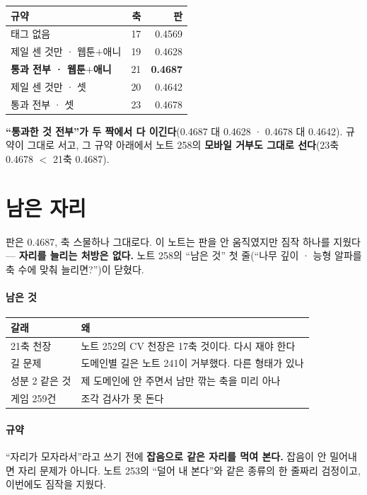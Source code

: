 \documentclass[10pt]{article}
\begin{document}
\begin{center}\small
\begin{tabular}{lrr}
\hline
규약 & 축 & 판 \\
\hline
태그 없음 & 17 & 0.4569 \\
제일 센 것만 · 웹툰$+$애니 & 19 & 0.4628 \\
\textbf{통과 전부 · 웹툰$+$애니} & 21 & \textbf{0.4687} \\
제일 센 것만 · 셋 & 20 & 0.4642 \\
통과 전부 · 셋 & 23 & 0.4678 \\
\hline
\end{tabular}
\end{center}

\textbf{``통과한 것 전부''가 두 짝에서 다 이긴다}(0.4687 대 0.4628 ·
0.4678 대 0.4642). 규약이 그대로 서고, 그 규약 아래에서 노트 258의
\textbf{모바일 거부도 그대로 선다}(23축 0.4678 $<$ 21축 0.4687).

\section{남은 자리}

판은 0.4687, 축 스물하나 그대로다. 이 노트는 판을 안 움직였지만 짐작 하나를
지웠다 --- \textbf{자리를 늘리는 처방은 없다.} 노트 258의 ``남은 것'' 첫
줄(``나무 깊이 · 능형 알파를 축 수에 맞춰 늘리면?'')이 닫혔다.

\paragraph{남은 것}
\begin{center}\small
\begin{tabular}{ll}
\hline
갈래 & 왜 \\
\hline
21축 천장 & 노트 252의 CV 천장은 17축 것이다. 다시 재야 한다 \\
길 문제 & 도메인별 길은 노트 241이 거부했다. 다른 형태가 있나 \\
성분 2 같은 것 & 제 도메인에 안 주면서 남만 깎는 축을 미리 아나 \\
게임 259건 & 조각 검사가 못 돈다 \\
\hline
\end{tabular}
\end{center}

\paragraph{규약} ``자리가 모자라서''라고 쓰기 전에 \textbf{잡음으로 같은
자리를 먹여 본다.} 잡음이 안 밀어내면 자리 문제가 아니다. 노트 253의
``덜어 내 본다''와 같은 종류의 한 줄짜리 검정이고, 이번에도 짐작을 지웠다.
\end{document}
